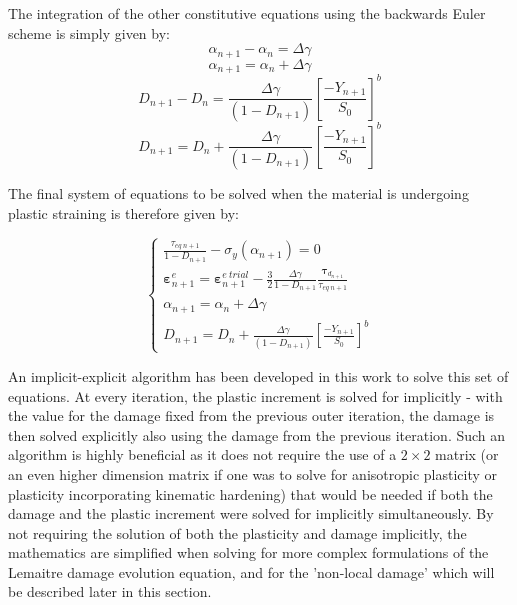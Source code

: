 \documentclass[sn-mathphys,Numbered,draft]{sn-jnl}%
\begin{document}
The integration of the other constitutive equations using the backwards Euler scheme is simply given by:
\begin{equation}
	\alpha_{n+1}-\alpha_n=\Delta\gamma
\end{equation}
\begin{equation}
   \alpha_{n+1}=\alpha_n+\Delta\gamma	
\end{equation}
\begin{equation}
	D_{n+1}-D_n=\frac{\Delta\gamma}{\left(1-D_{n+1}\right)}\left[\frac{-Y_{n+1}}{S_0}\right]^b
\end{equation}
\begin{equation}
D_{n+1}=D_n+\frac{\Delta\gamma}{\left(1-D_{n+1}\right)}\left[\frac{-Y_{n+1}}{S_0}\right]^b	
\end{equation}

The final system of equations to be solved when the material is undergoing plastic straining is therefore given by:

\begin{equation}
\left\{\begin{array}{c}
\frac{\tau_{eq\ n+1}}{1-D_{n+1}}-\sigma_y\left(\alpha_{n+1}\right)=0 \\
\boldsymbol{\varepsilon}_{n+1}^e=\boldsymbol{\varepsilon}_{n+1}^{e\ trial}-\frac{3}{2} \frac{\Delta \gamma}{1-D_{n+1}} \frac{\boldsymbol{\tau}_{d_{n+1}}}{\tau_{eq\ n+1}}\\
\alpha_{n+1}=\alpha_n+\Delta \gamma \\
D_{n+1}=D_n+\frac{\Delta\gamma}{\left(1-D_{n+1}\right)}\left[\frac{-Y_{n+1}}{S_0}\right]^b
\end{array}\right. 
\end{equation}



An implicit-explicit algorithm has been developed in this work to solve this set of equations. At every iteration, the plastic increment is solved for implicitly - with the value for the damage fixed from the previous outer iteration, the damage is then solved explicitly also using the damage from the previous iteration. Such an algorithm is highly beneficial as it does not require the use of a $2 \times 2$ matrix (or an even higher dimension matrix if one was to solve for anisotropic plasticity or plasticity incorporating kinematic hardening) that would be needed if both the damage and the plastic increment were solved for implicitly simultaneously. By not requiring the solution of both the plasticity and damage implicitly, the mathematics are simplified when solving for more complex formulations of the Lemaitre damage evolution equation, and for the 'non-local damage' which will be described later in this section.
\end{document}
